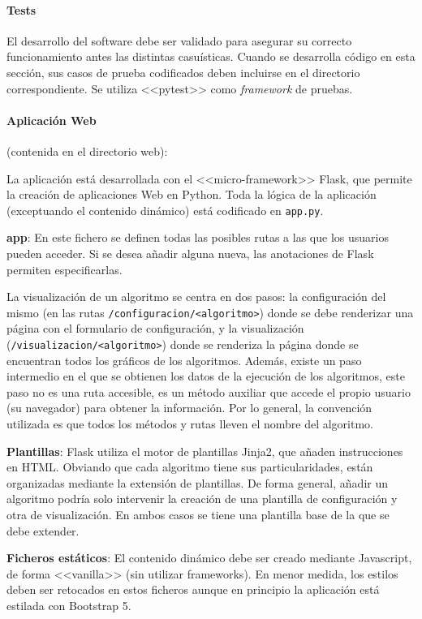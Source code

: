 \paragraph{Tests} El desarrollo del software debe ser validado para asegurar su
correcto funcionamiento antes las distintas casuísticas. Cuando se desarrolla
código en esta sección, sus casos de prueba codificados deben incluirse en el
directorio correspondiente. Se utiliza <<pytest>> como \textit{framework} de
pruebas.


\paragraph{Aplicación Web} (contenida en el directorio web):  

La aplicación está desarrollada con el <<micro-framework>> Flask, que permite la
creación de aplicaciones Web en Python. Toda la lógica de la aplicación
(exceptuando el contenido dinámico) está codificado en \texttt{app.py}. 

\textbf{app}: En este fichero se definen todas las posibles rutas a las que los
usuarios pueden acceder. Si se desea añadir alguna nueva, las anotaciones de Flask
permiten especificarlas.

La visualización de un algoritmo se centra en dos pasos: la configuración del
mismo (en las rutas \texttt{/configuracion/<algoritmo>}) donde se debe
renderizar una página con el formulario de configuración, y la visualización
(\texttt{/visualizacion/<algoritmo>}) donde se renderiza la página donde se
encuentran todos los gráficos de los algoritmos. Además, existe un paso
intermedio en el que se obtienen los datos de la ejecución de los algoritmos,
este paso no es una ruta accesible, es un método auxiliar que accede el propio
usuario (su navegador) para obtener la información. Por lo general, la
convención utilizada es que todos los métodos y rutas lleven el nombre del
algoritmo.

\textbf{Plantillas}: Flask utiliza el motor de plantillas Jinja2, que añaden
instrucciones en HTML. Obviando que cada algoritmo tiene sus particularidades,
están organizadas mediante la extensión de plantillas. De forma general, añadir
un algoritmo podría solo intervenir la creación de una plantilla de
configuración y otra de visualización. En ambos casos se tiene una plantilla
base de la que se debe extender.

\textbf{Ficheros estáticos}: El contenido dinámico debe ser creado mediante
Javascript, de forma <<vanilla>> (sin utilizar frameworks). En menor medida, los
estilos deben ser retocados en estos ficheros aunque en principio la aplicación
está estilada con Bootstrap 5.

